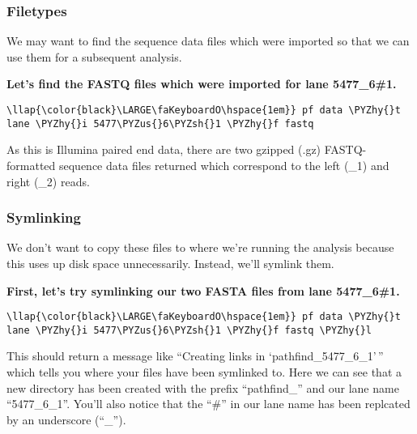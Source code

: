\documentclass[11pt]{article}
\def\PYZus{\char`\_}
\def\PYZsh{\char`\#}
\def\PYZhy{\char`\-}
\begin{document}
\hypertarget{filetypes}{%
\subsubsection{Filetypes}\label{filetypes}}

We may want to find the sequence data files which were imported so that
we can use them for a subsequent analysis.

\textbf{Let's find the FASTQ files which were imported for lane
5477\_6\#1.}

\begin{terminalinput}
\begin{Verbatim}[commandchars=\\\{\}]
\llap{\color{black}\LARGE\faKeyboardO\hspace{1em}} pf data \PYZhy{}t lane \PYZhy{}i 5477\PYZus{}6\PYZsh{}1 \PYZhy{}f fastq
\end{Verbatim}
\end{terminalinput}

    As this is Illumina paired end data, there are two gzipped (.gz)
FASTQ-formatted sequence data files returned which correspond to the
left (\_1) and right (\_2) reads.

    \hypertarget{symlinking}{%
\subsubsection{Symlinking}\label{symlinking}}

We don't want to copy these files to where we're running the analysis
because this uses up disk space unnecessarily. Instead, we'll symlink
them.

\textbf{First, let's try symlinking our two FASTA files from lane
5477\_6\#1.}

\begin{terminalinput}
\begin{Verbatim}[commandchars=\\\{\}]
\llap{\color{black}\LARGE\faKeyboardO\hspace{1em}} pf data \PYZhy{}t lane \PYZhy{}i 5477\PYZus{}6\PYZsh{}1 \PYZhy{}f fastq \PYZhy{}l
\end{Verbatim}
\end{terminalinput}

    This should return a message like ``Creating links in
`pathfind\_5477\_6\_1'\,'' which tells you where your files have been
symlinked to. Here we can see that a new directory has been created with
the prefix ``pathfind\_'' and our lane name ``5477\_6\_1''. You'll also
notice that the ``\#'' in our lane name has been replcated by an
underscore (``\_'').
\end{document}
